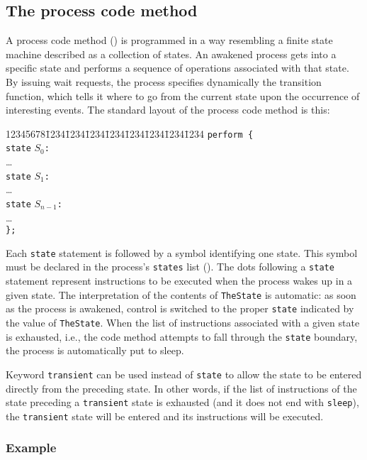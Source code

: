 \subsection{The process code method}
\label{rm_pr_pc}

A process code method () is programmed in a way resembling
a finite state machine described as a collection of states.
An awakened process gets into a specific state
and performs a sequence of operations associated with that state.
By issuing wait requests, the process specifies dynamically the transition
function, which tells it where to go from the current state upon the occurrence
of interesting events.
The standard layout of the process code method is this:
{\tt\begin{tabbing}
12345678\=1234\=1234\=1234\=1234\=1234\=1234\=1234\=1234\kill
\> {\tt perform \{} \\
\> \> {\tt state} $S_0${\tt :} \\
\> \> \> \ldots \\
\> \> {\tt state} $S_1${\tt :} \\
\> \> \> \ldots \\
\> \> {\tt state} $S_{n-1}${\tt :} \\
\> \> \> \ldots \\
\> {\tt \};}
\end{tabbing}}

Each {\tt state} statement is followed by a symbol identifying one
state.
This symbol must be declared in the process's
{\tt states} list ().
The dots following a {\tt state} statement represent
instructions to be executed when the process wakes up in a given state.
The interpretation of the contents of {\tt TheState} is automatic:
as soon as the process is awakened, control is switched to the proper
{\tt state} indicated by the value of {\tt TheState}.
When the list of instructions associated with a given state is
exhausted, i.e., the code method attempts to fall through the {\tt state}
boundary, the process is automatically put to sleep.

Keyword {\tt transient} can be used instead of {\tt state} to allow the
state to be entered directly from the preceding state.
In other words, if the list of instructions of the state preceding a
{\tt transient} state is exhausted (and it does not end with
{\tt sleep}), the {\tt transient} state will be entered and its
instructions will be executed.

\subsubsection*{Example}

